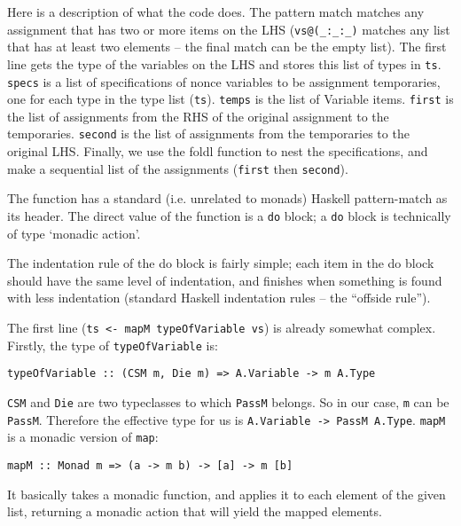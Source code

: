 \documentclass[a4wide]{article}
\begin{document}
Here is a description of what the code does.
The pattern match matches any assignment that has two or more items on the LHS (\lstinline|vs@(_:_:_)| 
matches any list that has at least two elements -- the final match can be the empty list).
The first line gets the type of the variables on the LHS and stores this list of types in \lstinline|ts|.
\lstinline|specs| is a list of specifications of nonce variables to be assignment temporaries, one for each
type in the type list (\lstinline|ts|).  \lstinline|temps| is the list of Variable items.  \lstinline|first| is the list
of assignments from the RHS of the original assignment to the temporaries.  \lstinline|second| is the list
of assignments from the temporaries to the original LHS.  Finally, we use the foldl function
to nest the specifications, and make a sequential list of the assignments (\lstinline|first| then \lstinline|second|).

The function has a standard (i.e. unrelated to monads) Haskell pattern-match as its header.  The direct value of
the function is a \lstinline|do| block; a \lstinline|do| block is technically of type `monadic action'.

The indentation rule of the do block is fairly simple; each item in the do block should have the same level of
indentation, and finishes when something is found with less indentation (standard Haskell indentation rules -- the ``offside rule'').

The first line (\lstinline|ts <- mapM typeOfVariable vs|) is already somewhat complex.  Firstly, the type of
\lstinline|typeOfVariable| is:

\begin{lstlisting}
typeOfVariable :: (CSM m, Die m) => A.Variable -> m A.Type
\end{lstlisting}

\lstinline|CSM| and \lstinline|Die| are two typeclasses to which \lstinline|PassM| belongs.  So in our case, \lstinline|m| can be \lstinline|PassM|.
Therefore the effective type for us is \lstinline|A.Variable -> PassM A.Type|.  \lstinline|mapM| is a monadic
version of \lstinline|map|:

\begin{lstlisting}
mapM :: Monad m => (a -> m b) -> [a] -> m [b]
\end{lstlisting}

It basically takes a monadic function, and applies it to each element of the given list, returning a monadic
action that will yield the mapped elements.
\end{document}
